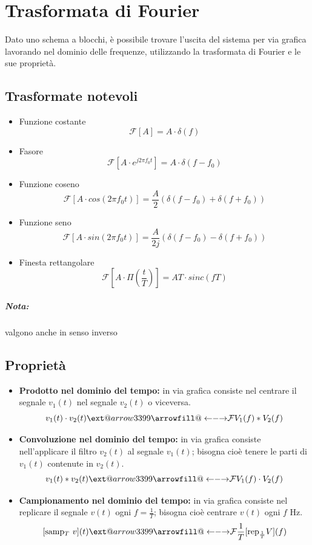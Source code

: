 \documentclass[a4paper]{article}
\makeatletter
\newcommand{\xleftrightarrow}[2][]{%
  \ext@arrow3399{\longleftrightarrowfill@}{#1}{#2}}
\newcommand{\longleftrightarrowfill@}{%
  \arrowfill@\leftarrow\relbar\rightarrow}
\makeatother
\begin{document}
	
	\section{Trasformata di Fourier}
	
	Dato uno schema a blocchi, è possibile trovare l’uscita del sistema per via grafica lavorando nel dominio delle frequenze, utilizzando la trasformata di Fourier e le sue proprietà.
	
	\subsection{Trasformate notevoli}
	\begin{itemize}
		\item Funzione costante
			\[
			\mathcal{F} \left[ A \right] = A \cdot \delta(f)
			\]
		\item Fasore
			\[
			\mathcal{F} \left[ A \cdot e^{j 2\pi f_0 t} \right] = A \cdot \delta(f-f_0)
			\]
		\item Funzione coseno
			\[
			\mathcal{F} \left[ A \cdot cos(2\pi f_0 t) \right] = \frac{A}{2} \left( \delta(f-f_0) + \delta(f+f_0) \right)
			\]
		\item Funzione seno
			\[
			\mathcal{F} \left[ A \cdot sin(2\pi f_0 t) \right] = \frac{A}{2j} \left( \delta(f-f_0) - \delta(f+f_0) \right)
			\]
		\item Finesta rettangolare
			\[
			\mathcal{F} \left[ A \cdot \Pi \left( \frac{t}{T} \right) \right] = AT \cdot sinc(fT)
			\]
	\end{itemize}
	
	\subparagraph{Nota:} valgono anche in senso inverso
	
	\subsection{Proprietà}
	\begin{itemize}
		\item \textbf{Prodotto nel dominio del tempo:} in via grafica consiste nel centrare il segnale $v_1(t)$ nel segnale $v_2(t)$ o viceversa.
			\[ v_1(t) \cdot v_2(t) \xleftrightarrow{\mathcal{F}} V_1(f) * V_2(f) \]
		\item \textbf{Convoluzione nel dominio del tempo:} in via grafica consiste nell'applicare il filtro $v_2(t)$ al segnale $v_1(t)$; bisogna cioè tenere le parti di $v_1(t)$ contenute in $v_2(t)$.
			\[ v_1(t) * v_2(t) \xleftrightarrow{\mathcal{F}} V_1(f) \cdot V_2(f) \]
		\item \textbf{Campionamento nel dominio del tempo:} in via grafica consiste nel replicare il segnale $v(t)$ ogni $f = \frac{1}{T}$; bisogna cioè centrare $v(t)$ ogni $f$ Hz.
			\[
			[\text{samp$_T$ } v](t) \xleftrightarrow{\mathcal{F}} \frac{1}{T} [\text{rep$_{\frac{1}{T}}$} V](f)
			\]
	\end{itemize}
	
\end{document}
